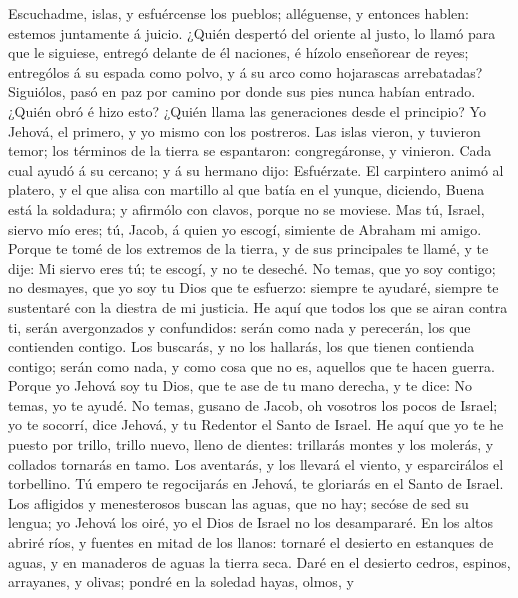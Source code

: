  Escuchadme, islas, y esfuércense los pueblos; alléguense, y
entonces hablen: estemos juntamente á juicio.  ¿Quién
despertó del oriente al justo, lo llamó para que le siguiese, entregó
delante de él naciones, é hízolo enseñorear de reyes; entrególos á su
espada como polvo, y á su arco como hojarascas arrebatadas? 
Siguiólos, pasó en paz por camino por donde sus pies nunca habían
entrado.  ¿Quién obró é hizo esto? ¿Quién llama las
generaciones desde el principio? Yo Jehová, el primero, y yo mismo con
los postreros.  Las islas vieron, y tuvieron temor; los
términos de la tierra se espantaron: congregáronse, y vinieron.
 Cada cual ayudó á su cercano; y á su hermano dijo:
Esfuérzate.  El carpintero animó al platero, y el que alisa
con martillo al que batía en el yunque, diciendo, Buena está la
soldadura; y afirmólo con clavos, porque no se moviese.  Mas
tú, Israel, siervo mío eres; tú, Jacob, á quien yo escogí, simiente de
Abraham mi amigo.  Porque te tomé de los extremos de la
tierra, y de sus principales te llamé, y te dije: Mi siervo eres tú; te
escogí, y no te deseché.  No temas, que yo soy contigo; no
desmayes, que yo soy tu Dios que te esfuerzo: siempre te ayudaré,
siempre te sustentaré con la diestra de mi justicia.  He
aquí que todos los que se airan contra ti, serán avergonzados y
confundidos: serán como nada y perecerán, los que contienden contigo.
 Los buscarás, y no los hallarás, los que tienen contienda
contigo; serán como nada, y como cosa que no es, aquellos que te hacen
guerra.  Porque yo Jehová soy tu Dios, que te ase de tu
mano derecha, y te dice: No temas, yo te ayudé.  No temas,
gusano de Jacob, oh vosotros los pocos de Israel; yo te socorrí, dice
Jehová, y tu Redentor el Santo de Israel.  He aquí que yo
te he puesto por trillo, trillo nuevo, lleno de dientes: trillarás
montes y los molerás, y collados tornarás en tamo.  Los
aventarás, y los llevará el viento, y esparcirálos el torbellino. Tú
empero te regocijarás en Jehová, te gloriarás en el Santo de Israel.
 Los afligidos y menesterosos buscan las aguas, que no hay;
secóse de sed su lengua; yo Jehová los oiré, yo el Dios de Israel no los
desampararé.  En los altos abriré ríos, y fuentes en mitad
de los llanos: tornaré el desierto en estanques de aguas, y en manaderos
de aguas la tierra seca.  Daré en el desierto cedros,
espinos, arrayanes, y olivas; pondré en la soledad hayas, olmos, y
